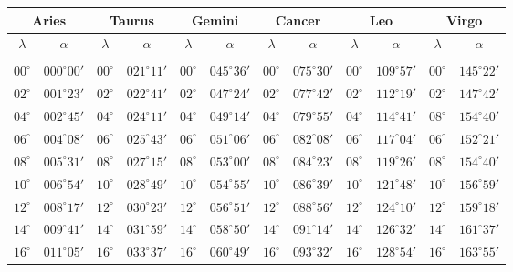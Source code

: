 \clearpage
\begin{table}[!h]
\vspace{0.25cm}
\centering
{\scriptsize\begin{tabular}{cc|cc|cc|cc|cc|cc}
\multicolumn{2}{c}{Aries}\vline & \multicolumn{2}{c}{Taurus} \vline& \multicolumn{2}{c}{Gemini} \vline& \multicolumn{2}{c}{Cancer}\vline &
\multicolumn{2}{c}{Leo}\vline & \multicolumn{2}{c}{Virgo}\\\hline
$\lambda$& $\alpha$& $\lambda$& $\alpha$& $\lambda$& $\alpha$& $\lambda$& $\alpha$& $\lambda$& $\alpha$& $\lambda$& $\alpha$\\\hline
&&&&&&&&&&&\\[-2ex]
$00^\circ$ & $000^\circ00'$ & $00^\circ$ & $021^\circ11'$ & $00^\circ$ & $045^\circ36'$ & $00^\circ$ & $075^\circ30'$ & $00^\circ$ & $109^\circ57'$ & $00^\circ$ & $145^\circ22'$\\
$02^\circ$ & $001^\circ23'$ & $02^\circ$ & $022^\circ41'$ & $02^\circ$ & $047^\circ24'$ & $02^\circ$ & $077^\circ42'$ & $02^\circ$ & $112^\circ19'$ & $02^\circ$ & $147^\circ42'$\\
$04^\circ$ & $002^\circ45'$ & $04^\circ$ & $024^\circ11'$ & $04^\circ$ & $049^\circ14'$ & $04^\circ$ & $079^\circ55'$ & $04^\circ$ & $114^\circ41'$ & $08^\circ$ & $154^\circ40'$\\
$06^\circ$ & $004^\circ08'$ & $06^\circ$ & $025^\circ43'$ & $06^\circ$ & $051^\circ06'$ & $06^\circ$ & $082^\circ08'$ & $06^\circ$ & $117^\circ04'$ & $06^\circ$ & $152^\circ21'$\\
$08^\circ$ & $005^\circ31'$ & $08^\circ$ & $027^\circ15'$ & $08^\circ$ & $053^\circ00'$ & $08^\circ$ & $084^\circ23'$ & $08^\circ$ & $119^\circ26'$ & $08^\circ$ & $154^\circ40'$\\
$10^\circ$ & $006^\circ54'$ & $10^\circ$ & $028^\circ49'$ & $10^\circ$ & $054^\circ55'$ & $10^\circ$ & $086^\circ39'$ & $10^\circ$ & $121^\circ48'$ & $10^\circ$ & $156^\circ59'$\\
$12^\circ$ & $008^\circ17'$ & $12^\circ$ & $030^\circ23'$ & $12^\circ$ & $056^\circ51'$ & $12^\circ$ & $088^\circ56'$ & $12^\circ$ & $124^\circ10'$ & $12^\circ$ & $159^\circ18'$\\
$14^\circ$ & $009^\circ41'$ & $14^\circ$ & $031^\circ59'$ & $14^\circ$ & $058^\circ50'$ & $14^\circ$ & $091^\circ14'$ & $14^\circ$ & $126^\circ32'$ & $14^\circ$ & $161^\circ37'$\\
$16^\circ$  & $011^\circ05'$ & $16^\circ$ & $033^\circ37'$ & $16^\circ$ & $060^\circ49'$ & $16^\circ$ & $093^\circ32'$ & $16^\circ$ & $128^\circ54'$ & $16^\circ$ & $163^\circ55'$\\

\end{tabular}}
\end{table}
